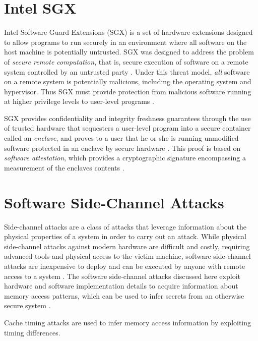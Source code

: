 \section{Intel SGX}

Intel Software Guard Extensions (SGX) is a set of hardware extensions designed to allow programs to run securely in an environment where all software on the host machine is potentially untrusted. SGX was designed to address the problem of \emph{secure remote computation}, that is, secure execution of software on a remote system controlled by an untrusted party \cite{intel_corporation_intel_2016}. Under this threat model, \emph{all} software on a remote system is potentially malicious, including the operating system and hypervisor. Thus SGX must provide protection from malicious software running at higher privilege levels to user-level programs \cite{costan_intel_2016}. 

SGX provides confidentiality and integrity freshness guarantees through the use of trusted hardware that sequesters a user-level program into a secure container called an \emph{enclave}, and proves to a user that he or she is running unmodified software protected in an enclave by secure hardware \cite{intel_corporation_intel_2016}. This proof is based on \emph{software attestation}, which provides a cryptographic signature encompassing a measurement of the enclaves contents \cite{costan_intel_2016}. 



\section{Software Side-Channel Attacks}

Side-channel attacks are a class of attacks that leverage information about the physical properties of a system in order to carry out an attack. While physical side-channel attacks against modern hardware are difficult and costly, requiring advanced tools and physical access to the victim machine, software side-channel attacks are inexpensive to deploy and can be executed by anyone with remote access to a system \cite{costan_intel_2016}. The software side-channel attacks discussed here exploit hardware and software implementation details to acquire information about memory access patterns, which can be used to infer secrets from an otherwise secure system \cite{gotzfried_cache_2017, schwarz_malware_2017, xu_controlled-channel_2015, shinde_preventing_2015}. 

Cache timing attacks are used to infer memory access information by exploiting timing differences.


